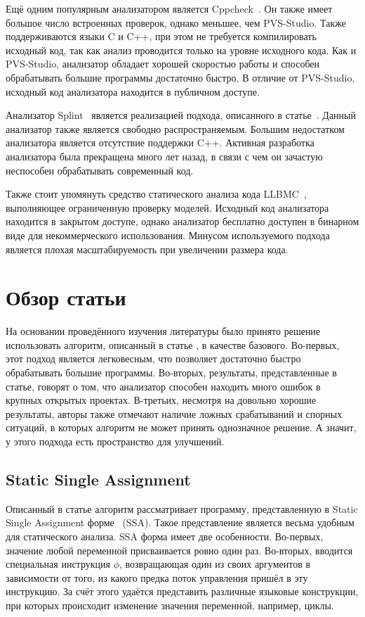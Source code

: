 Ещё одним популярным анализатором является
Cppcheck~\cite{cppcheck}. Он также имеет большое число встроенных
проверок, однако меньшее, чем PVS-Studio. Также поддерживаются языки C
и C++, при этом не требуется компилировать исходный код, так как
анализ проводится только на уровне исходного кода. Как и PVS-Studio,
анализатор обладает хорошей скоростью работы и способен обрабатывать
большие программы достаточно быстро. В отличие от PVS-Studio, исходный
код анализатора находится в публичном доступе.

Анализатор Splint~\cite{splint} является реализацией подхода,
описанного в статье~\cite{larochelle2001statically}. Данный анализатор
также является свободно распространяемым. Большим недостатком
анализатора является отсутствие поддержки C++. Активная разработка
анализатора была прекращена много лет назад, в связи с чем он зачастую
неспособен обрабатывать современный код.

Также стоит упомянуть средство статического анализа кода
LLBMC~\cite{merz2012llbmc}, выполняющее ограниченную проверку
моделей. Исходный код анализатора находится в закрытом доступе, однако
анализатор бесплатно доступен в бинарном виде для некоммерческого
использования. Минусом используемого подхода является плохая
масштабируемость при увеличении размера кода.

\section{Обзор статьи~\cite{li2010practical}}

На основании проведённого изучения литературы было принято решение
использовать алгоритм, описанный в статье \cite{li2010practical}, в
качестве базового. Во-первых, этот подход является легковесным, что
позволяет достаточно быстро обрабатывать большие программы. Во-вторых,
результаты, представленные в статье, говорят о том, что анализатор
способен находить много ошибок в крупных открытых проектах. В-третьих,
несмотря на довольно хорошие результаты, авторы также отмечают наличие
ложных срабатываний и спорных ситуаций, в которых алгоритм не может
принять однозначное решение. А значит, у этого подхода есть
пространство для улучшений.

\subsection{Static Single Assignment}

Описанный в статье алгоритм рассматривает программу, представленную в
Static Single Assignment форме~\cite{cytron1991efficiently} (SSA). Такое
представление является весьма удобным для статического анализа. SSA
форма имеет две особенности. Во-первых, значение любой переменной
присваивается ровно один раз. Во-вторых, вводится специальная
инструкция $\phi$, возвращающая один из своих аргументов в зависимости
от того, из какого предка поток управления пришёл в эту инструкцию. За
счёт этого удаётся представить различные языковые конструкции, при
которых происходит изменение значения переменной, например, циклы.


